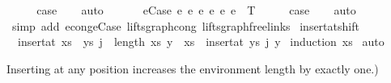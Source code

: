 \begin{isabellebody}
\ \ \isamarkupfalse%
\ \isamarkupfalse%
\ {\isacharquery}{\kern0pt}case\isanewline
\ \ \isamarkupfalse%
\ auto\isanewline
\ \ \isamarkupfalse%
\isanewline
{}\isamarkupfalse%
\isanewline
\ \ \isamarkupfalse%
\ {\isacharparenleft}{\kern0pt}e{\isacharunderscore}{\kern0pt}Case\ e{}\ e{}{\isacharprime}{\kern0pt}\ e{}\ e{}{\isacharprime}{\kern0pt}\ e{}\ e{}{\isacharprime}{\kern0pt}\ {\isasymGamma}\ T{\isacharparenright}{\kern0pt}\isanewline
\ \ \isamarkupfalse%
\ \isamarkupfalse%
\ {\isacharquery}{\kern0pt}case\isanewline
\ \ \isamarkupfalse%
\ auto\isanewline
\ \ \isamarkupfalse%
\ {\isacharparenleft}{\kern0pt}simp\ add{\isacharcolon}{\kern0pt}\ econg{\isachardot}{\kern0pt}e{\isacharunderscore}{\kern0pt}Case\ lifts{\isacharunderscore}{\kern0pt}graph{\isacharunderscore}{\kern0pt}cong\ lifts{\isacharunderscore}{\kern0pt}graph{\isacharunderscore}{\kern0pt}freelinks{\isacharparenright}{\kern0pt}\isanewline
{}\isamarkupfalse%
%
\endisatagproof
{\isafoldproof}%
%
\isadelimproof
%
\endisadelimproof
%
\isadelimdocument
%
\endisadelimdocument
%
\isatagdocument
%
\isamarkuptrue%
%
\endisatagdocument
{\isafolddocument}%
%
\isadelimdocument
%
\endisadelimdocument
{}\isamarkupfalse%
\ insert{\isacharunderscore}{\kern0pt}at{\isacharunderscore}{\kern0pt}shift{\isacharcolon}{\kern0pt}\isanewline
\ \ {\isachardoublequoteopen}insert{\isacharunderscore}{\kern0pt}at\ {\isacharparenleft}{\kern0pt}xs\ {\isacharat}{\kern0pt}\ ys{\isacharparenright}{\kern0pt}\ {\isacharparenleft}{\kern0pt}j\ {\isacharplus}{\kern0pt}\ length\ xs{\isacharparenright}{\kern0pt}\ y\ {\isacharequal}{\kern0pt}\ xs\ {\isacharat}{\kern0pt}\ insert{\isacharunderscore}{\kern0pt}at\ ys\ j\ y{\isachardoublequoteclose}\isanewline
%
\isadelimproof
%
\endisadelimproof
%
\isatagproof
{}\isamarkupfalse%
\ {\isacharparenleft}{\kern0pt}induction\ xs{\isacharparenright}{\kern0pt}\isanewline
{}\isamarkupfalse%
\ auto%
\endisatagproof
{\isafoldproof}%
%
\isadelimproof
%
\endisadelimproof
%
\begin{isamarkuptext}%
Inserting at any position increases the environment length by exactly one.)%
\end{isamarkuptext}\isamarkuptrue%
\isamarkupfalse%

\end{isabellebody}
